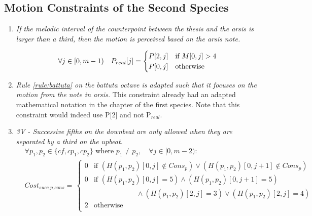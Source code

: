 \subsection*{Motion Constraints of the Second Species}
\begin{enumerate}[wide, label=\bfseries 2.P\arabic*]

\item\label{rule:motion2nd}{\textit{If the melodic interval of the counterpoint between the thesis and the arsis is larger than a third, then the motion is perceived based on the arsis note.}}


\begin{equation}
    \begin{gathered}
        \forall j \in [0, m-1) \quad
        P_{real}[j] = \begin{cases}
            P[2, j] & \text{if } M[0, j] > 4\\
            P[0, j] & \text{otherwise}
        \end{cases}
    \end{gathered}
\end{equation}

\item\label{rule:battuta2}{ \textit{Rule \ref{rule:battuta} on the battuta octave is adapted such that it focuses on the motion from the note in arsis.}}
This constraint already had an adapted mathematical notation in the chapter of the first species. Note that this constraint would indeed use P[2] and not P$_{real}$.


\item \textit{3V - Successive fifths on the downbeat are only allowed when they are separated by a third on the upbeat.}    
    \begin{equation}
        \begin{aligned}
            & \forall p_1, p_2 \in \{\mathit{cf}, cp_1, cp_2\} \text{ where }  p_1 \neq p_2, \quad \forall j \in [0, m-2): \\
            &Cost_{succ\_p\_cons} = \,  
            \begin{cases}
                0 & \text{if } (H(p_1, p_2)[0, j] \notin Cons_p) \lor (H(p_1, p_2)[0, j+1] \notin Cons_p)\\
                0 & \text{if } (H(p_1, p_2)[0, j] = 5 ) \land (H(p_1, p_2)[0, j+1] = 5) \\
                & \quad \quad \quad \quad \quad \quad\land (H(p_1, p_2)[2, j] = 3) \lor (H(p_1, p_2)[2, j] = 4)\\
                2 & \text{otherwise } \\
            \end{cases}\\
        \end{aligned}
    \end{equation}

\end{enumerate}

